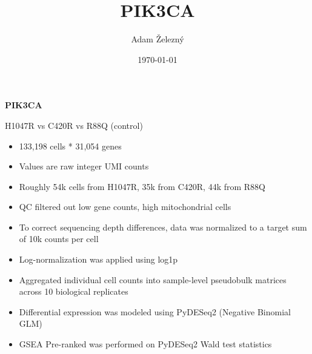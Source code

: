 \documentclass[10pt, aspectratio=169]{beamer}
\title[PIK3CA scRNA-seq]{PIK3CA}
\author{Adam Železný}
\date{\today}
\begin{document}
\begin{frame}
  \vspace{1.5cm}
  \begin{center}
    {\Huge \textbf{PIK3CA}}
  \end{center}
\end{frame}

\begin{frame}{H1047R vs C420R vs R88Q (control)}
  \begin{itemize}
    \item 133,198 cells * 31,054 genes
    \item Values are raw integer UMI counts
    \item Roughly 54k cells from H1047R, 35k from C420R, 44k from R88Q
    \item QC filtered out low gene counts, high mitochondrial cells
    \item To correct sequencing depth differences, data was normalized to a target sum of 10k counts per cell
    \item Log-normalization was applied using log1p
    \item Aggregated individual cell counts into sample-level pseudobulk matrices across 10 biological replicates
    \item Differential expression was modeled using PyDESeq2 (Negative Binomial GLM)
    \item GSEA Pre-ranked was performed on PyDESeq2 Wald test statistics
  \end{itemize}
\end{frame}
\end{document}
